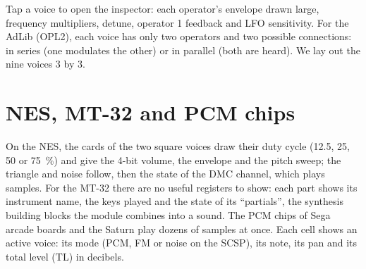 Tap a voice to open the inspector: each operator's envelope drawn large, frequency multipliers, detune, operator 1
feedback and LFO sensitivity.
For the AdLib (OPL2), each voice has only two operators and two possible connections: in series (one modulates the
other) or in parallel (both are heard). We lay out the nine voices 3 by 3.

\section{NES, MT-32 and PCM chips}
On the NES, the cards of the two square voices draw their duty cycle (12.5, 25, 50 or 75~\%) and give the 4-bit
volume, the envelope and the pitch sweep; the triangle and noise follow, then the state of the DMC channel, which
plays samples. For the MT-32 there are no useful registers to show: each part shows its instrument name, the keys
played and the state of its ``partials'', the synthesis building blocks the module combines into a sound.
The PCM chips of Sega arcade boards and the Saturn play dozens of samples at once. Each cell shows an active voice:
its mode (PCM, FM or noise on the SCSP), its note, its pan and its total level (TL) in decibels.

